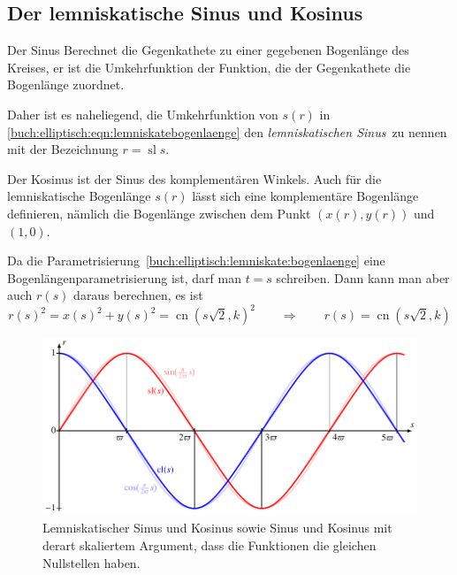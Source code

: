 \subsection{Der lemniskatische Sinus und Kosinus}
Der Sinus Berechnet die Gegenkathete zu einer gegebenen Bogenlänge des
Kreises, er ist die Umkehrfunktion der Funktion, die der Gegenkathete
die Bogenlänge zuordnet.

Daher ist es naheliegend, die Umkehrfunktion von $s(r)$ in 
\eqref{buch:elliptisch:eqn:lemniskatebogenlaenge}
den {\em lemniskatischen Sinus} zu nennen mit der Bezeichnung
$r=\operatorname{sl} s$.

Der Kosinus ist der Sinus des komplementären Winkels.
Auch für die lemniskatische Bogenlänge $s(r)$ lässt sich eine
komplementäre Bogenlänge definieren, nämlich die Bogenlänge zwischen
dem Punkt $(x(r), y(r))$ und $(1,0)$.

Da die Parametrisierung~\eqref{buch:elliptisch:lemniskate:bogenlaenge}
eine Bogenlängenparametrisierung ist, darf man $t=s$ schreiben.
Dann kann man aber auch $r(s)$ daraus berechnen,
es ist
\[
r(s)^2
=
x(s)^2 + y(s)^2
=
\operatorname{cn}(s\sqrt{2},k)^2
\qquad\Rightarrow\qquad
r(s)
=
\operatorname{cn}(s\sqrt{2},k)
\]

\begin{figure}
\centering
\includegraphics{chapters/110-elliptisch/images/slcl.pdf}
\caption{
Lemniskatischer Sinus und Kosinus sowie Sinus und Kosinus
mit derart skaliertem Argument, dass die Funktionen die gleichen Nullstellen
haben.
\label{buch:elliptisch:figure:slcl}}
\end{figure}
